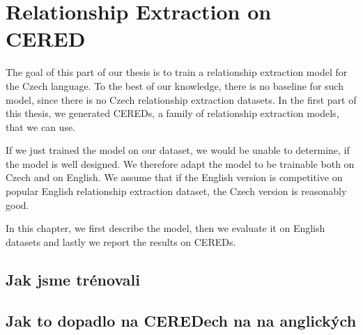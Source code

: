 \chapter{Relationship Extraction on CERED}
The goal of this part of our thesis is to train a relationship extraction model for the Czech language. To the best of our knowledge, there is no baseline for such model, since there is no Czech relationship extraction datasets. In the first part of this thesis, we generated CEREDs, a family of relationship extraction models, that we can use.

If we just trained the model on our dataset, we would be unable to determine, if the model is well designed. We therefore adapt the model to be trainable both on Czech and on English. We assume that if the English version is competitive on popular English relationship extraction dataset, the Czech version is reasonably good.

In this chapter, we first describe the model, then we evaluate it on English datasets and lastly we report the results on CEREDs.

\section{Jak jsme trénovali}
\section{Jak to dopadlo na CEREDech na na anglických}
